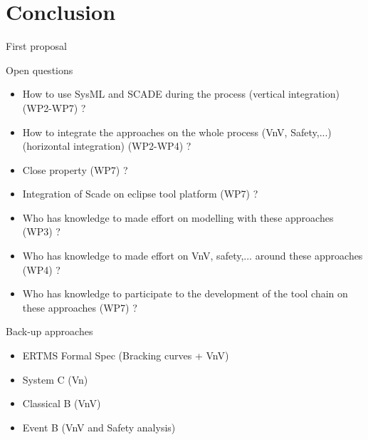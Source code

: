 
\section{Conclusion}


\begin{frame}{First proposal}


\begin{center}

 
\end{center}

\end{frame}


\begin{frame}{Open questions}


\begin{itemize}
\item 
How to use SysML and SCADE during the process (vertical integration) (WP2-WP7) ?
\item How to integrate the approaches on the whole process (VnV, Safety,...) (horizontal integration) (WP2-WP4) ?
\item
Close property (WP7) ?
\item
Integration of Scade on eclipse  tool platform (WP7) ?
\item
Who has knowledge to made effort on modelling with these approaches (WP3) ?
\item 
Who has knowledge to made effort on VnV, safety,... around these approaches (WP4) ?
\item
Who has knowledge to participate to the development of the tool chain on these approaches (WP7) ?
\end{itemize}

\end{frame}


\begin{frame}{Back-up approaches}

\begin{itemize}
\item ERTMS Formal Spec (Bracking curves + VnV)
\item System C (Vn)
\item Classical B (VnV)
\item Event B (VnV and Safety analysis)
\end{itemize}

\end{frame}

